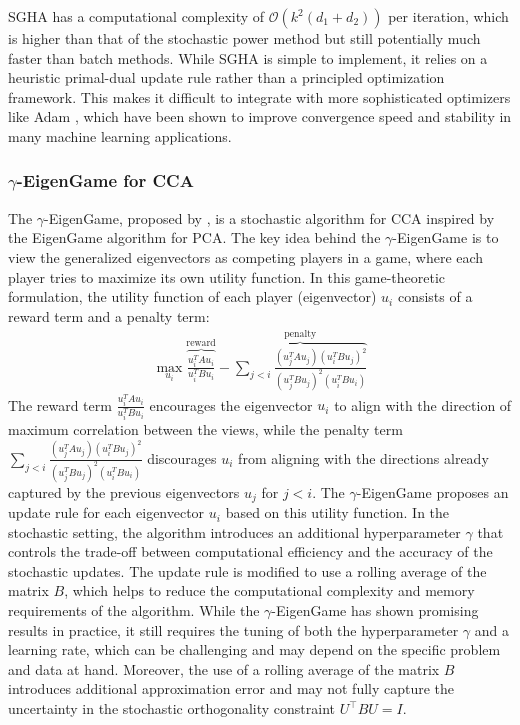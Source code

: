 SGHA has a computational complexity of $\mathcal{O}(k^2(d_1+ d_2))$ per iteration, which is higher than that of the stochastic power method but still potentially much faster than batch methods.
While SGHA is simple to implement, it relies on a heuristic primal-dual update rule rather than a principled optimization framework. This makes it difficult to integrate with more sophisticated optimizers like Adam \citep{kingma2014adam}, which have been shown to improve convergence speed and stability in many machine learning applications.
\subsubsection{$\gamma$-EigenGame for CCA}
The $\gamma$-EigenGame, proposed by \citet{gemp20,gemp2021}, is a stochastic algorithm for CCA inspired by the EigenGame algorithm for PCA. The key idea behind the $\gamma$-EigenGame is to view the generalized eigenvectors as competing players in a game, where each player tries to maximize its own utility function.
In this game-theoretic formulation, the utility function of each player (eigenvector) $u_i$ consists of a reward term and a penalty term:
\begin{align}
\max_{u_i} \overbrace{\frac{u_i^TAu_i}{u_i^TBu_i}}^{\text{reward}} - \overbrace{\sum_{j < i} \frac{(u_j^TAu_j)(u_i^TBu_j)^2}{(u_j^TBu_j)^2(u_i^TBu_i)}}^{\text{penalty}}
\end{align}
The reward term $\frac{u_i^TAu_i}{u_i^TBu_i}$ encourages the eigenvector $u_i$ to align with the direction of maximum correlation between the views, while the penalty term $\sum_{j < i} \frac{(u_j^TAu_j)(u_i^TBu_j)^2}{(u_j^TBu_j)^2(u_i^TBu_i)}$ discourages $u_i$ from aligning with the directions already captured by the previous eigenvectors $u_j$ for $j < i$.
The $\gamma$-EigenGame proposes an update rule for each eigenvector $u_i$ based on this utility function. In the stochastic setting, the algorithm introduces an additional hyperparameter $\gamma$ that controls the trade-off between computational efficiency and the accuracy of the stochastic updates. The update rule is modified to use a rolling average of the matrix $B$, which helps to reduce the computational complexity and memory requirements of the algorithm.
While the $\gamma$-EigenGame has shown promising results in practice, it still requires the tuning of both the hyperparameter $\gamma$ and a learning rate, which can be challenging and may depend on the specific problem and data at hand.
Moreover, the use of a rolling average of the matrix $B$ introduces additional approximation error and may not fully capture the uncertainty in the stochastic orthogonality constraint $U^\top B U = I$.

